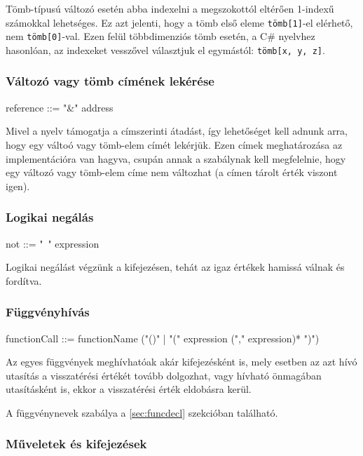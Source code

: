Tömb-típusú változó esetén abba indexelni a megszokottól eltérően 1-indexű számokkal lehetséges. Ez azt jelenti, hogy a tömb első eleme \texttt{tömb[1]}-el elérhető, nem \texttt{tömb[0]}-val. Ezen felül többdimenziós tömb esetén, a C\# nyelvhez hasonlóan, az indexeket vesszővel választjuk el egymástól: \texttt{tömb[x, y, z]}.

\subsubsection{Változó vagy tömb címének lekérése}

\begin{ebnf}
reference ::= "&" address
\end{ebnf}

Mivel a nyelv támogatja a címszerinti átadást, így lehetőséget kell adnunk arra, hogy egy váltoó vagy tömb-elem címét lekérjük. Ezen címek meghatározása az implementációra van hagyva, csupán annak a szabálynak kell megfelelnie, hogy egy változó vagy tömb-elem címe nem változhat (a címen tárolt érték viszont igen).

\subsubsection{Logikai negálás}

\begin{ebnf}
not ::= "~" expression
\end{ebnf}

Logikai negálást végzünk a kifejezésen, tehát az igaz értékek hamissá válnak és fordítva.

\subsubsection{Függvényhívás}

\begin{ebnf}
functionCall ::= functionName ("()" | "(" expression ("," expression)* ")")
\end{ebnf}

Az egyes függvények meghívhatóak akár kifejezésként is, mely esetben az azt hívó utasítás a visszatérési értékét tovább dolgozhat, vagy hívható önmagában utasításként is, ekkor a visszatérési érték eldobásra kerül.

A függvénynevek szabálya a \ref{sec:funcdecl} szekcióban található.

\subsubsection{Műveletek és kifejezések}
\label{sec:expressions}


